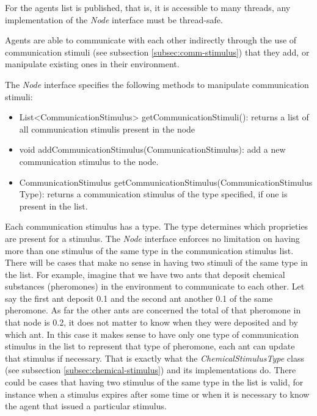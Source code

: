 For the agents list is published, that is, it is accessible to many threads, any implementation of the \emph{Node} interface must be thread-safe.

Agents are able to communicate with each other indirectly through the use of communication stimuli (see subsection \ref{subsec:comm-stimulus}) that they add, or manipulate existing ones in their environment.

The \emph{Node} interface specifies the following methods to manipulate communication stimuli:

\begin{itemize}
  \item List<CommunicationStimulus> getCommunicationStimuli(): returns a list of all communication stimulis present in the node
  
  \item void addCommunicationStimulus(CommunicationStimulus): add a new communication stimulus to the node.
  
  \item CommunicationStimulus getCommunicationStimulus(CommunicationStimulus Type): returns a communication stimulus of the type specified, if one is present in the list.
\end{itemize}

Each communication stimulus has a type. The type determines which proprieties are present for a stimulus. The \emph{Node} interface enforces no limitation on having more than one stimulus of the same type in the communication stimulus list. There will be cases that make no sense in having two stimuli of the same type in the list. For example, imagine that we have two ants that deposit chemical substances (pheromones) in the environment to communicate to each other. Let say the first ant deposit 0.1 and the second ant another 0.1 of the same pheromone. As far the other ants are concerned the total of that pheromone in that node is 0.2, it does not matter to know when they were deposited and by which ant. In this case it makes sense to have only one type of communication stimulus in the list to represent that type of pheromone, each ant can update that stimulus if necessary. That is exactly what the \emph{ChemicalStimulusType} class (see  subsection \ref{subsec:chemical-stimulus}) and its implementations do. There could be cases that having two stimulus of the same type in the list is valid, for instance when a stimulus expires after some time or when it is necessary to know the agent that issued a particular stimulus.


